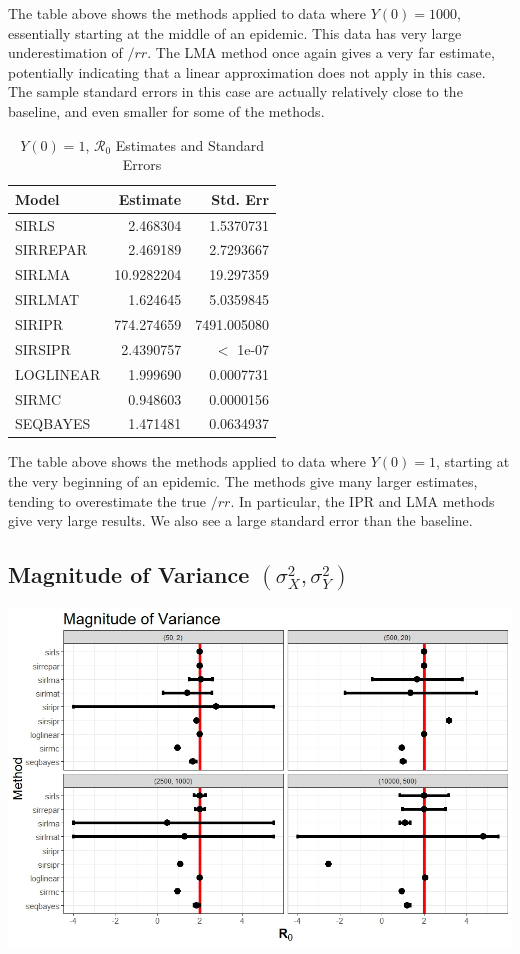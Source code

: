 \documentclass[12pt]{article}
\newcommand{\rr}{\ensuremath{\mathcal{R}_0}}
\begin{document}
The table above shows the methods applied to data where $Y(0) = 1000$, essentially starting at the middle of an epidemic. This data has very large underestimation of $/rr$. The LMA method once again gives a very far estimate, potentially indicating that a linear approximation does not apply in this case. The sample standard errors in this case are actually relatively close to the baseline, and even smaller for some of the methods.

\begin{table}[H]
	
	\caption{\label{tab:}$Y(0) = 1$, $\rr$ Estimates and Standard Errors}
	\centering
	\begin{tabular}[t]{l|r|r}
		\hline
		Model & Estimate & Std. Err\\
		\hline
		SIRLS & 2.468304 & 1.5370731\\
		\hline
		SIRREPAR & 2.469189 & 2.7293667\\
		\hline
		SIRLMA & 10.9282204 & 19.297359 \\
		\hline
		SIRLMAT & 1.624645 & 5.0359845\\
		\hline
		SIRIPR & 774.274659 & 7491.005080 \\
		\hline
		SIRSIPR & 2.4390757 & $<$ 1e-07 \\
		\hline
		LOGLINEAR & 1.999690 & 0.0007731\\
		\hline
		SIRMC & 0.948603 & 0.0000156\\
		\hline
		SEQBAYES & 1.471481 & 0.0634937\\
		\hline
	\end{tabular}
\end{table}

The table above shows the methods applied to data where $Y(0) = 1$, starting at the very beginning of an epidemic. The methods give many larger estimates, tending to overestimate the true $/rr$. In particular, the IPR and LMA methods give very large results. We also see a large standard error than the baseline.

\subsection{Magnitude of Variance $(\sigma^2_X, \sigma^2_Y)$}\label{sec:res-var}

\includegraphics[scale=0.5]{var.jpeg}
\end{document}
